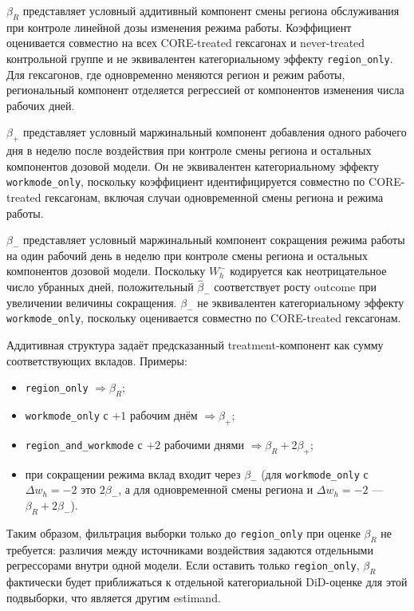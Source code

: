 \documentclass[14pt,a4paper]{extarticle}
\begin{document}
\(\beta_R\) представляет условный аддитивный компонент смены региона обслуживания при контроле линейной дозы изменения режима работы. Коэффициент оценивается совместно на всех CORE-treated гексагонах и never-treated контрольной группе и не эквивалентен категориальному эффекту \texttt{region\_only}. Для гексагонов, где одновременно меняются регион и режим работы, региональный компонент отделяется регрессией от компонентов изменения числа рабочих дней.

\(\beta_+\) представляет условный маржинальный компонент добавления одного рабочего дня в неделю после воздействия при контроле смены региона и остальных компонентов дозовой модели. Он не эквивалентен категориальному эффекту \texttt{workmode\_only}, поскольку коэффициент идентифицируется совместно по CORE-treated гексагонам, включая случаи одновременной смены региона и режима работы.

\(\beta_-\) представляет условный маржинальный компонент сокращения режима работы на один рабочий день в неделю при контроле смены региона и остальных компонентов дозовой модели. Поскольку \(W_h^-\) кодируется как неотрицательное число убранных дней, положительный \(\hat\beta_-\) соответствует росту outcome при увеличении величины сокращения. \(\beta_-\) не эквивалентен категориальному эффекту \texttt{workmode\_only}, поскольку оценивается совместно по CORE-treated гексагонам.

Аддитивная структура задаёт предсказанный treatment-компонент как сумму
соответствующих вкладов. Примеры:
\begin{itemize}
  \item \texttt{region\_only} $\Rightarrow \beta_R$;
  \item \texttt{workmode\_only} с $+1$ рабочим днём $\Rightarrow \beta_+$;
  \item \texttt{region\_and\_workmode} с $+2$ рабочими днями
        $\Rightarrow \beta_R+2\beta_+$;
  \item при сокращении режима вклад входит через $\beta_-$
        (для \texttt{workmode\_only} с $\Delta w_h=-2$ это $2\beta_-$,
        а для одновременной смены региона и $\Delta w_h=-2$ ---
        $\beta_R+2\beta_-$).
\end{itemize}
Таким образом, фильтрация выборки только до \texttt{region\_only} при оценке \(\beta_R\) не требуется: различия между источниками воздействия задаются отдельными регрессорами внутри одной модели. Если оставить только \texttt{region\_only}, \(\beta_R\) фактически будет приближаться к отдельной категориальной DiD-оценке для этой подвыборки, что является другим estimand.
\end{document}

